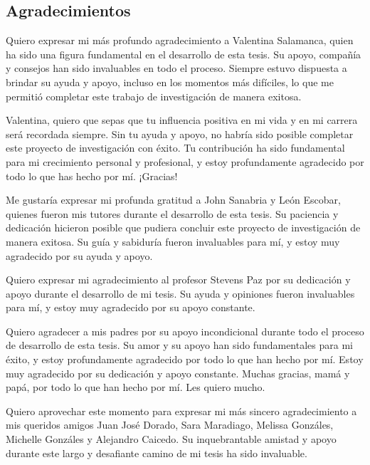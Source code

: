 \begin{spacing}{1.5}
    \begin{tightcenter}
      \section{Agradecimientos}
      \mylinespacing
    \end{tightcenter}
  
    Quiero expresar mi más profundo agradecimiento a Valentina Salamanca, quien ha sido una figura fundamental en el desarrollo de esta tesis. Su apoyo, compañía y consejos han sido invaluables en todo el proceso. Siempre estuvo dispuesta a brindar su ayuda y apoyo, incluso en los momentos más difíciles, lo que me permitió completar este trabajo de investigación de manera exitosa.

    Valentina, quiero que sepas que tu influencia positiva en mi vida y en mi carrera será recordada siempre. Sin tu ayuda y apoyo, no habría sido posible completar este proyecto de investigación con éxito. Tu contribución ha sido fundamental para mi crecimiento personal y profesional, y estoy profundamente agradecido por todo lo que has hecho por mí. ¡Gracias!
    
    Me gustaría expresar mi profunda gratitud a John Sanabria y León Escobar, quienes fueron mis tutores durante el desarrollo de esta tesis. Su paciencia y dedicación hicieron posible que pudiera concluir este proyecto de investigación de manera exitosa. Su guía y sabiduría fueron invaluables para mí, y estoy muy agradecido por su ayuda y apoyo.
    
    Quiero expresar mi agradecimiento al profesor Stevens Paz por su dedicación y apoyo durante el desarrollo de mi tesis. Su ayuda y opiniones fueron invaluables para mí, y estoy muy agradecido por su apoyo constante.
    
    Quiero agradecer a mis padres por su apoyo incondicional durante todo el proceso de desarrollo de esta tesis. Su amor y su apoyo han sido fundamentales para mi éxito, y estoy profundamente agradecido por todo lo que han hecho por mí. Estoy muy agradecido por su dedicación y apoyo constante. Muchas gracias, mamá y papá, por todo lo que han hecho por mí. Les quiero mucho.
    
    Quiero aprovechar este momento para expresar mi más sincero agradecimiento a mis queridos amigos Juan José Dorado, Sara Maradiago, Melissa Gonzáles, Michelle Gonzáles y Alejandro Caicedo. Su inquebrantable amistad y apoyo durante este largo y desafiante camino de mi tesis ha sido invaluable.
    

\end{spacing}
